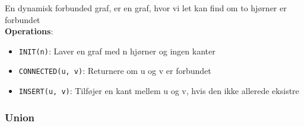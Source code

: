 En dynamisk forbunded graf, er en graf, hvor vi let kan find om to hjørner er forbundet\\
\textbf{Operations}:
\begin{itemize}
	\item \texttt{INIT(n)}: Laver en graf med n hjørner og ingen kanter
	\item \texttt{CONNECTED(u, v)}: Returnere om u og v er forbundet
	\item \texttt{INSERT(u, v)}: Tilføjer en kant mellem u og v, hvis den ikke allerede eksistre
\end{itemize}

\subsubsection{Union}
